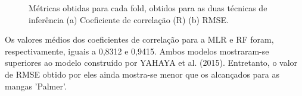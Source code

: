 \begin{figure}[H]
\centering
	\caption{Métricas obtidas para cada fold, obtidos para as duas técnicas de inferência (a) Coeficiente de correlação (R) (b) RMSE.}
	\label{fig:fold_sst_rgb}
\end{figure}

Os valores médios dos coeficientes de correlação para a MLR e RF foram, respectivamente, iguais a 0,8312 e 0,9415. Ambos modelos mostraram-se superiores ao modelo construído por YAHAYA et al. (2015). Entretanto, o valor de RMSE obtido por eles ainda mostra-se menor que os alcançados para as mangas 'Palmer'. 


